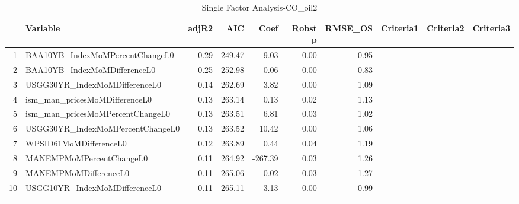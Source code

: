 \begin{longtable}{rlrrrrrlll}
  \hline
 & Variable & adjR2 & AIC & Coef & Robst p & RMSE\_OS & Criteria1 & Criteria2 & Criteria3 \\ 
  \hline
1 & BAA10YB\_IndexMoMPercentChangeL0 & 0.29 & 249.47 & -9.03 & 0.00 & 0.95 &  &  &  \\ 
  2 & BAA10YB\_IndexMoMDifferenceL0 & 0.25 & 252.98 & -0.06 & 0.00 & 0.83 &  &  &  \\ 
  3 & USGG30YR\_IndexMoMDifferenceL0 & 0.14 & 262.69 & 3.82 & 0.00 & 1.09 &  &  &  \\ 
  4 & ism\_man\_pricesMoMDifferenceL0 & 0.13 & 263.14 & 0.13 & 0.02 & 1.13 &  &  &  \\ 
  5 & ism\_man\_pricesMoMPercentChangeL0 & 0.13 & 263.51 & 6.81 & 0.03 & 1.02 &  &  &  \\ 
  6 & USGG30YR\_IndexMoMPercentChangeL0 & 0.13 & 263.52 & 10.42 & 0.00 & 1.06 &  &  &  \\ 
  7 & WPSID61MoMDifferenceL0 & 0.12 & 263.89 & 0.44 & 0.04 & 1.19 &  &  &  \\ 
  8 & MANEMPMoMPercentChangeL0 & 0.11 & 264.92 & -267.39 & 0.03 & 1.26 &  &  &  \\ 
  9 & MANEMPMoMDifferenceL0 & 0.11 & 265.06 & -0.02 & 0.03 & 1.27 &  &  &  \\ 
  10 & USGG10YR\_IndexMoMDifferenceL0 & 0.11 & 265.11 & 3.13 & 0.00 & 0.99 &  &  &  \\ 
   \hline
\hline
\caption{Single Factor Analysis-CO_oil2} 
\end{longtable}
